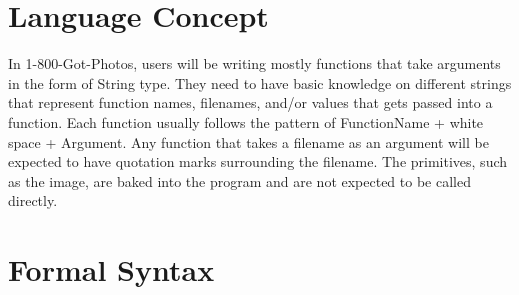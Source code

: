 \documentclass{article}
\begin{document}
\section{Language Concept}
In 1-800-Got-Photos, users will be writing mostly functions that take arguments in the form of String type. They need to have basic knowledge on different strings that represent function names, filenames, and/or values that gets passed into a function. Each function usually follows the pattern of FunctionName + white space + Argument. Any function that takes a filename as an argument will be expected to have quotation marks surrounding the filename. The primitives, such as the image, are baked into the program and are not expected to be called directly.

\section{Formal Syntax}
\end{document}
